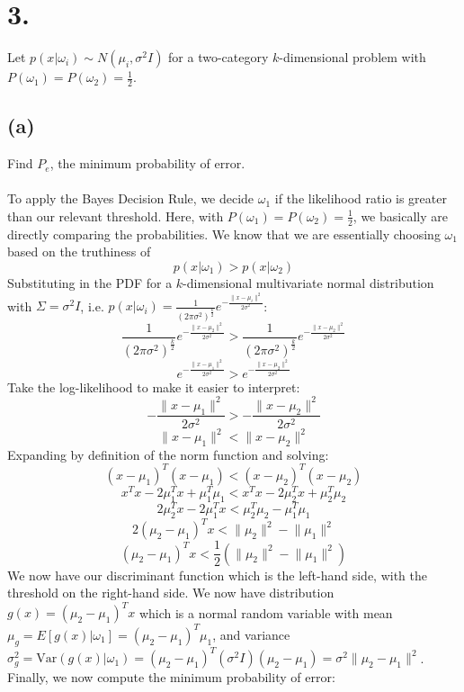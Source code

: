 \documentclass{article}
\begin{document}
{\Large 

\section*{3.}
Let \(p(x | \omega_i) \sim N (\mu_i, \sigma^2 I)\) for a two-category \(k\)-dimensional problem with \(P(\omega_1) = P(\omega_2) = \frac{1}{2}\). 

\subsection*{(a)} 
Find \(P_e\), the minimum probability of error. \\ \\
To apply the Bayes Decision Rule, we decide \(\omega_1\) if the likelihood ratio is greater than our relevant threshold. Here, with \(P(\omega_1) = P(\omega_2) = \frac{1}{2}\), we basically are directly comparing the probabilities. We know that we are essentially choosing \(\omega_1\) based on the truthiness of
\[
  p(x | \omega_1) > p(x | \omega_2)
\]
Substituting in the PDF for a \(k\)-dimensional multivariate normal distribution with \(\Sigma = \sigma^2 I\), i.e. \(p(x | \omega_i) = \frac{1}{(2\pi\sigma^2)^{\frac{k}{2}}} e^{-\frac{\lVert x-\mu_i \rVert^2}{2\sigma^2}}\):
\[
  \frac{1}{(2\pi\sigma^2)^{\frac{k}{2}}} e^{-\frac{\lVert x-\mu_2 \rVert^2}{2\sigma^2}} > \frac{1}{(2\pi\sigma^2)^{\frac{k}{2}}} e^{-\frac{\lVert x-\mu_2 \rVert^2}{2\sigma^2}}
\]
\[
  e^{-\frac{\lVert x-\mu_1 \rVert^2}{2\sigma^2}} > e^{-\frac{\lVert x-\mu_2 \rVert^2}{2\sigma^2}}
\]
Take the log-likelihood to make it easier to interpret:
\[
  -\frac{\lVert x-\mu_1 \rVert^2}{2\sigma^2} > -\frac{\lVert x-\mu_2 \rVert^2}{2\sigma^2}
\]
\[
 \lVert x-\mu_1 \rVert^2 < \lVert x-\mu_2 \rVert^2
\]
Expanding by definition of the norm function and solving:
\[
  (x-\mu_1)^T (x-\mu_1) < (x-\mu_2)^T (x-\mu_2)  
\]
\[
  x^Tx - 2\mu_1^Tx + \mu_1^T\mu_1 < x^Tx - 2\mu_2^Tx + \mu_2^T\mu_2 
\]
\[
  2\mu_2^Tx - 2\mu_1^Tx < \mu_2^T\mu_2 - \mu_1^T\mu_1
\]
\[
  2(\mu_2 - \mu_1)^Tx < \lVert \mu_2 \rVert ^2 - \lVert \mu_1 \rVert^2 
\]
\[
  (\mu_2 - \mu_1)^Tx < \frac{1}{2}(\lVert \mu_2 \rVert ^2 - \lVert \mu_1 \rVert^2)
\]
We now have our discriminant function which is the left-hand side, with the threshold on the right-hand side. We now have distribution \(g(x) = (\mu_2 - \mu_1)^Tx\) which is a normal random variable with mean \(\mu_g = E[g(x) | \omega_1] = (\mu_2 - \mu_1)^T\mu_1\), and variance \(\sigma^2_g = \text{Var}(g(x) | \omega_1) = (\mu_2 - \mu_1)^T(\sigma^2 I)(\mu_2 - \mu_1) = \sigma^2 \lVert \mu_2 - \mu_1 \rVert^2\). Finally, we now compute the minimum probability of error:
}
\end{document}
